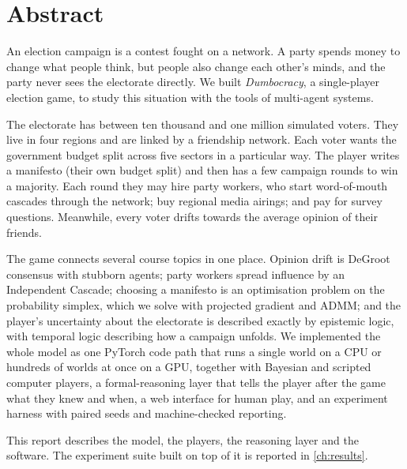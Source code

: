 \documentclass[11pt,a4paper,oneside]{report}
\begin{document}

\chapter*{Abstract}

An election campaign is a contest fought on a network. A party spends money to change what people think,
but people also change each other's minds, and the party never sees the electorate directly. We built
\emph{Dumbocracy}, a single-player election game, to study this situation with the tools of multi-agent
systems.

The electorate has between ten thousand and one million simulated voters. They live in four regions and
are linked by a friendship network. Each voter wants the government budget split across five sectors in a
particular way. The player writes a manifesto (their own budget split) and then has a few campaign rounds
to win a majority. Each round they may hire party workers, who start word-of-mouth cascades through the
network; buy regional media airings; and pay for survey questions. Meanwhile, every voter drifts towards
the average opinion of their friends.

The game connects several course topics in one place. Opinion drift is DeGroot consensus with stubborn
agents; party workers spread influence by an Independent Cascade; choosing a manifesto is an optimisation
problem on the probability simplex, which we solve with projected gradient and ADMM; and the player's
uncertainty about the electorate is described exactly by epistemic logic, with temporal logic describing
how a campaign unfolds. We implemented the whole model as one PyTorch code path that runs a single world on
a CPU or hundreds of worlds at once on a GPU, together with Bayesian and scripted computer players, a
formal-reasoning layer that tells the player after the game what they knew and when, a web interface for
human play, and an experiment harness with paired seeds and machine-checked reporting.

This report describes the model, the players, the reasoning layer and the software. The experiment suite
built on top of it is reported in \cref{ch:results}.

\tableofcontents
\clearpage
\listoffigures
\listoftables
\clearpage
{}
\end{document}
